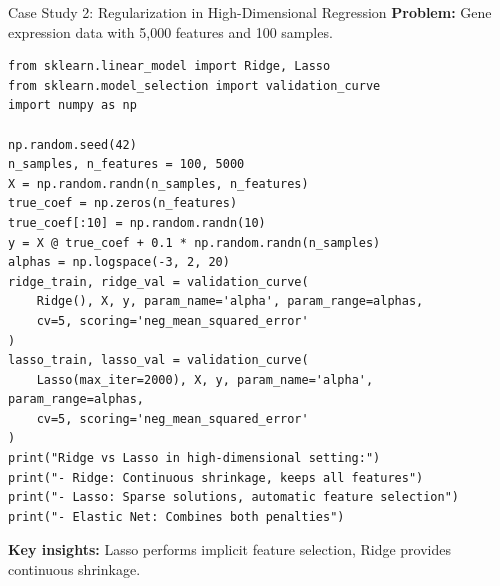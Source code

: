 \documentclass[aspectratio=169,11pt]{beamer}
\begin{document}
\begin{frame}[fragile]{Case Study 2: Regularization in High-Dimensional Regression}
\textbf{Problem:} Gene expression data with 5{,}000 features and 100 samples.

\begin{lstlisting}[basicstyle=\ttfamily\tiny]
from sklearn.linear_model import Ridge, Lasso
from sklearn.model_selection import validation_curve
import numpy as np

np.random.seed(42)
n_samples, n_features = 100, 5000
X = np.random.randn(n_samples, n_features)
true_coef = np.zeros(n_features)
true_coef[:10] = np.random.randn(10)
y = X @ true_coef + 0.1 * np.random.randn(n_samples)
alphas = np.logspace(-3, 2, 20)
ridge_train, ridge_val = validation_curve(
    Ridge(), X, y, param_name='alpha', param_range=alphas,
    cv=5, scoring='neg_mean_squared_error'
)
lasso_train, lasso_val = validation_curve(
    Lasso(max_iter=2000), X, y, param_name='alpha', param_range=alphas,
    cv=5, scoring='neg_mean_squared_error'
)
print("Ridge vs Lasso in high-dimensional setting:")
print("- Ridge: Continuous shrinkage, keeps all features")
print("- Lasso: Sparse solutions, automatic feature selection")
print("- Elastic Net: Combines both penalties")
\end{lstlisting}

\textbf{Key insights:} Lasso performs implicit feature selection, Ridge provides continuous shrinkage.
\end{frame}
\end{document}
